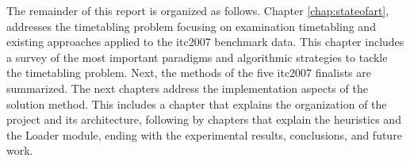 The remainder of this report is organized as follows. Chapter \ref{chap:stateofart}, addresses the timetabling problem focusing on examination timetabling and existing approaches applied to the \gls{itc2007} benchmark data. This chapter includes a survey of the most important paradigms and algorithmic strategies to tackle the timetabling problem. Next, the methods of the five \gls{itc2007} finalists are summarized. The next chapters address the implementation aspects of the solution method. This includes a chapter that explains the organization of the project and its architecture, following by chapters that explain the heuristics and the Loader module, ending with the experimental results, conclusions, and future work.